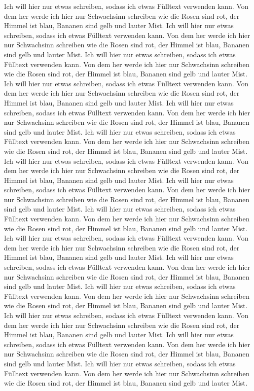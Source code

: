 Ich will hier nur etwas schreiben, sodass ich etwas Fülltext verwenden kann. Von dem her werde ich hier nur Schwachsinn schreiben wie die Rosen sind rot, der Himmel ist blau, Bananen sind gelb und lauter Mist. Ich will hier nur etwas schreiben, sodass ich etwas Fülltext verwenden kann. Von dem her werde ich hier nur Schwachsinn schreiben wie die Rosen sind rot, der Himmel ist blau, Bananen sind gelb und lauter Mist. Ich will hier nur etwas schreiben, sodass ich etwas Fülltext verwenden kann. Von dem her werde ich hier nur Schwachsinn schreiben wie die Rosen sind rot, der Himmel ist blau, Bananen sind gelb und lauter Mist. Ich will hier nur etwas schreiben, sodass ich etwas Fülltext verwenden kann. Von dem her werde ich hier nur Schwachsinn schreiben wie die Rosen sind rot, der Himmel ist blau, Bananen sind gelb und lauter Mist. Ich will hier nur etwas schreiben, sodass ich etwas Fülltext verwenden kann. Von dem her werde ich hier nur Schwachsinn schreiben wie die Rosen sind rot, der Himmel ist blau, Bananen sind gelb und lauter Mist. Ich will hier nur etwas schreiben, sodass ich etwas Fülltext verwenden kann. Von dem her werde ich hier nur Schwachsinn schreiben wie die Rosen sind rot, der Himmel ist blau, Bananen sind gelb und lauter Mist. Ich will hier nur etwas schreiben, sodass ich etwas Fülltext verwenden kann. Von dem her werde ich hier nur Schwachsinn schreiben wie die Rosen sind rot, der Himmel ist blau, Bananen sind gelb und lauter Mist. Ich will hier nur etwas schreiben, sodass ich etwas Fülltext verwenden kann. Von dem her werde ich hier nur Schwachsinn schreiben wie die Rosen sind rot, der Himmel ist blau, Bananen sind gelb und lauter Mist. Ich will hier nur etwas schreiben, sodass ich etwas Fülltext verwenden kann. Von dem her werde ich hier nur Schwachsinn schreiben wie die Rosen sind rot, der Himmel ist blau, Bananen sind gelb und lauter Mist. Ich will hier nur etwas schreiben, sodass ich etwas Fülltext verwenden kann. Von dem her werde ich hier nur Schwachsinn schreiben wie die Rosen sind rot, der Himmel ist blau, Bananen sind gelb und lauter Mist. Ich will hier nur etwas schreiben, sodass ich etwas Fülltext verwenden kann. Von dem her werde ich hier nur Schwachsinn schreiben wie die Rosen sind rot, der Himmel ist blau, Bananen sind gelb und lauter Mist. Ich will hier nur etwas schreiben, sodass ich etwas Fülltext verwenden kann. Von dem her werde ich hier nur Schwachsinn schreiben wie die Rosen sind rot, der Himmel ist blau, Bananen sind gelb und lauter Mist. Ich will hier nur etwas schreiben, sodass ich etwas Fülltext verwenden kann. Von dem her werde ich hier nur Schwachsinn schreiben wie die Rosen sind rot, der Himmel ist blau, Bananen sind gelb und lauter Mist. Ich will hier nur etwas schreiben, sodass ich etwas Fülltext verwenden kann. Von dem her werde ich hier nur Schwachsinn schreiben wie die Rosen sind rot, der Himmel ist blau, Bananen sind gelb und lauter Mist. Ich will hier nur etwas schreiben, sodass ich etwas Fülltext verwenden kann. Von dem her werde ich hier nur Schwachsinn schreiben wie die Rosen sind rot, der Himmel ist blau, Bananen sind gelb und lauter Mist. 

